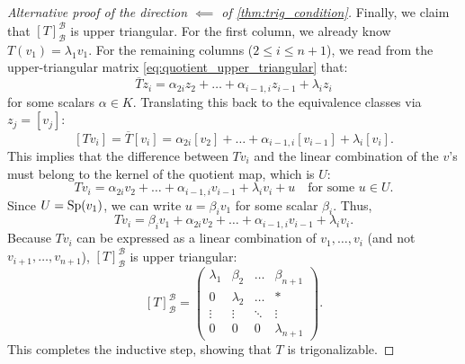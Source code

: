 \begin{proof}[Alternative proof of the direction $\impliedby$ of \cref{thm:trig_condition}]
  Finally, we claim that $[T]_{\mathcal{B}}^{\mathcal{B}}$ is upper triangular.
  For the first column, we already know $T(v_1) = \lambda_1 v_1$.
  For the remaining columns ($2 \le i \le n+1$), we read from the upper-triangular matrix \eqref{eq:quotient_upper_triangular} that:
  \[ \overline{T} z_i = \alpha_{2i}z_2 + \dots + \alpha_{i-1, i}z_{i-1} + \lambda_i z_i \]
  for some scalars $\alpha \in K$. Translating this back to the equivalence classes via $z_j = [v_j]$:
  \[ [T v_i] = \overline{T}[v_i] = \alpha_{2i}[v_2] + \dots + \alpha_{i-1, i}[v_{i-1}] + \lambda_i [v_i]. \]
  This implies that the difference between $Tv_i$ and the linear combination of the $v$'s must belong to the kernel of the quotient map, which is $U$:
  \[ Tv_i = \alpha_{2i}v_2 + \dots + \alpha_{i-1, i}v_{i-1} + \lambda_i v_i + u \quad \text{for some } u \in U. \]
  Since $U = \operatorname{Sp}(v_1)$, we can write $u = \beta_i v_1$ for some scalar $\beta_i$. Thus,
  \[ Tv_i = \beta_i v_1 + \alpha_{2i}v_2 + \dots + \alpha_{i-1, i}v_{i-1} + \lambda_i v_i. \]
  Because $Tv_i$ can be expressed as a linear combination of $v_1, \dots, v_i$ (and not $v_{i+1}, \dots, v_{n+1}$), $[T]_{\mathcal{B}}^{\mathcal{B}}$ is upper triangular:
  \[ [T]_{\mathcal{B}}^{\mathcal{B}} = \begin{pmatrix} \lambda_1 & \beta_2 & \dots & \beta_{n+1} \\ 0 & \lambda_2 & \dots & * \\ \vdots & \vdots & \ddots & \vdots \\ 0 & 0 & 0 & \lambda_{n+1} \end{pmatrix}. \]
  This completes the inductive step, showing that $T$ is trigonalizable.
\end{proof}


